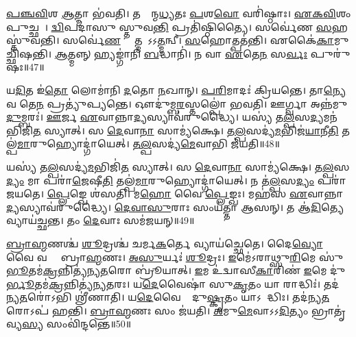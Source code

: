 \ul{𑌪}\ul{𑌞𑍍𑌚}\ul{𑌵𑌿}\ul{}𑌶 \ul{𑌆}𑌤𑍍𑌮𑌾 𑌭॑𑌵𑌤𑌿।
𑌤𑌸𑍍𑌮𑌾᳚𑌨𑍍𑌮\ul{𑌧𑍍𑌯}𑌤𑌃 \ul{𑌪}𑌶\ul{𑌵𑍋} 𑌵𑌰𑌿॑𑌷𑍍𑌠𑌾𑌃।
\ul{𑌏}\ul{𑌕}\ul{𑌵𑌿}\ul{}𑌶𑌂 𑌪𑍁𑌚𑍍𑌛𑌮𑍍᳚।
\ul{𑌦𑍍𑌵𑌿}𑌪𑌦𑌾॑𑌸𑍁 𑌸𑍍𑌤𑍁𑌵\ul{𑌨𑍍𑌤𑌿} 𑌪𑍍𑌰𑌤𑌿॑\-𑌷𑍍𑌠𑌿𑌤𑍍𑌯𑍈।
𑌸𑌰𑍍𑌵𑍇॑𑌣 \ul{𑌸}𑌹 𑌸𑍍𑌤𑍁॑𑌵𑌨𑍍𑌤𑌿।
𑌸𑌰𑍍𑌵𑍇॑\ul{𑌣} 𑌹𑍍𑌯𑌾᳚𑌤𑍍𑌮𑌨𑌾᳚\-𑌽𑌽\ul{𑌤𑍍𑌮}𑌨𑍍𑌵𑍀।
\ul{𑌸}𑌹𑍋𑌤𑍍𑌪𑌤॑𑌨𑍍𑌤𑌿।
𑌏𑌕𑍈॑\ul{𑌕𑌾}𑌮𑍁𑌚𑍍𑌛𑌿॑𑌷𑌨𑍍𑌤𑌿।
\ul{𑌆}𑌤𑍍𑌮𑌨𑍍𑌨𑍍 𑌹𑍍𑌯𑌙𑍍𑌗𑌾॑𑌨𑌿 \ul{𑌬}𑌦𑍍𑌧𑌾𑌨𑌿॑।
𑌨 𑌵𑌾 \ul{𑌏}𑌤𑍇\ul{𑌨} 𑌸\ul{𑌰𑍍𑌵𑌃} 𑌪𑍁𑌰𑍁॑𑌷𑌃॥47॥

𑌯\ul{𑌦𑌿}𑌤 𑌇॑\ul{𑌤𑍋} 𑌲𑍋𑌮𑌾॑𑌨𑌿 \ul{𑌦}𑌤𑍋 \ul{𑌨}𑌖𑌾𑌨𑍍।
\ul{𑌪}\ul{𑌰𑌿}𑌮𑌾𑌦𑌃॑ 𑌕𑍍𑌰𑌿𑌯𑌨𑍍𑌤𑍇।
𑌤𑌾\ul{𑌨𑍍𑌯𑍇}𑌵 𑌤𑍇\ul{𑌨} 𑌪𑍍𑌰𑌤𑍍𑌯𑍁॑𑌪𑍍𑌯𑌨𑍍𑌤𑍇।
𑌔𑌦𑍁॑𑌮𑍍𑌬\ul{𑌰}𑌸𑍍𑌤𑌲𑍍𑌪𑍋॑ 𑌭𑌵𑌤𑌿।
𑌊𑌰𑍍𑌗𑍍𑌵𑌾 𑌅𑌨𑍍𑌨॑𑌮𑍁\ul{𑌦𑍁}𑌮𑍍𑌬𑌰𑌃॑।
\ul{𑌊}𑌰𑍍𑌜 \ul{𑌏}𑌵𑌾𑌨𑍍𑌨𑌾\ul{𑌦𑍍𑌯}𑌸𑍍𑌯𑌾𑌵॑𑌰𑍁𑌦𑍍𑌧𑍍𑌯𑍈।
𑌯𑌸𑍍𑌯॑ 𑌤\ul{𑌲𑍍𑌪}𑌸\ul{𑌦𑍍𑌯}𑌮𑌨॑𑌭𑌿𑌜𑌿\ul{𑌤}\ul{} 𑌸𑍍𑌯𑌾𑌤𑍍।
𑌸 \ul{𑌦𑍇}𑌵𑌾\ul{𑌨𑌾}\ul{} 𑌸𑌾𑌮𑍍𑌯॑𑌕𑍍𑌷𑍇।
\ul{𑌤}\ul{𑌲𑍍𑌪}𑌸𑌦𑍍𑌯॑\ul{𑌮}𑌭𑌿𑌜॑\ul{𑌯𑌾}𑌨𑍀\ul{𑌤𑌿} 𑌤𑌲𑍍𑌪॑\ul{𑌮𑌾}𑌰𑍁𑌹𑍍𑌯𑍋𑌦𑍍𑌗𑌾॑𑌯𑍇𑌤𑍍।
\ul{𑌤}\ul{𑌲𑍍𑌪}𑌸𑌦𑍍𑌯॑\ul{𑌮𑍇}𑌵𑌾𑌭𑌿 𑌜॑𑌯𑌤𑌿॥48॥

𑌯𑌸𑍍𑌯॑ 𑌤\ul{𑌲𑍍𑌪}𑌸𑌦𑍍𑌯॑\ul{𑌮}𑌭𑌿𑌜𑌿॑\ul{𑌤}\ul{} 𑌸𑍍𑌯𑌾𑌤𑍍।
𑌸 \ul{𑌦𑍇}𑌵𑌾\ul{𑌨𑌾}\ul{} 𑌸𑌾𑌮𑍍𑌯॑𑌕𑍍𑌷𑍇।
\ul{𑌤}\ul{𑌲𑍍𑌪}𑌸\ul{𑌦𑍍𑌯𑌂} 𑌮𑌾 𑌪𑌰𑌾॑\ul{𑌜𑍇}𑌷𑍀\ul{𑌤𑌿} 𑌤𑌲𑍍𑌪॑\ul{𑌮𑌾}𑌰𑍁𑌹𑍍𑌯𑍋𑌦𑍍𑌗𑌾॑𑌯𑍇𑌤𑍍।
𑌨 𑌤॑\ul{𑌲𑍍𑌪}𑌸\ul{𑌦𑍍𑌯𑌂} 𑌪𑌰𑌾॑𑌜𑌯𑌤𑍇।
\ul{𑌪𑍍𑌲𑍇}𑌙𑍍𑌖𑍇 𑌶॑𑌸𑌤𑌿।
𑌮\ul{𑌹𑍋} 𑌵𑍈 \ul{𑌪𑍍𑌲𑍇}𑌙𑍍𑌖𑌃।
𑌮𑌹॑𑌸 \ul{𑌏}𑌵𑌾𑌨𑍍𑌨𑌾\ul{𑌦𑍍𑌯}𑌸𑍍𑌯𑌾𑌵॑𑌰𑍁𑌦𑍍𑌧𑍍𑌯𑍈।
\ul{𑌦𑍇}\ul{𑌵𑌾}\ul{𑌸𑍁}𑌰𑌾𑌃 𑌸𑌂𑌯॑𑌤𑍍𑌤𑌾 𑌆𑌸𑌨𑍍।
𑌤 𑌆॑\ul{𑌦𑌿}𑌤𑍍𑌯𑍇 𑌵𑍍𑌯𑌾𑌯॑𑌚𑍍𑌛𑌨𑍍𑌤।
𑌤𑌂 \ul{𑌦𑍇}𑌵𑌾𑌃 𑌸𑌮॑𑌜𑌯𑌨𑍍॥49॥

\ul{𑌬𑍍𑌰𑌾}\ul{𑌹𑍍𑌮}𑌣𑌶𑍍𑌚॑ \ul{𑌶𑍂}𑌦𑍍𑌰𑌶𑍍𑌚॑ 𑌚𑌰𑍍𑌮\ul{𑌕}𑌰𑍍𑌤𑍇 𑌵𑍍𑌯𑌾𑌯॑𑌚𑍍𑌛𑍇𑌤𑍇।
𑌦𑍈\ul{𑌵𑍍𑌯𑍋} 𑌵𑍈 𑌵𑌰𑍍𑌣𑍋᳚ 𑌬𑍍𑌰𑌾\ul{𑌹𑍍𑌮}𑌣𑌃।
\ul{𑌅}\ul{𑌸𑍁}𑌰𑍍𑌯𑌃॑ \ul{𑌶𑍂}𑌦𑍍𑌰𑌃।
\ul{𑌇}𑌮𑍇॑\-𑌽𑌰𑌾𑌥𑍍𑌸𑍁\ul{𑌰𑌿}𑌮𑍇 𑌸𑍁॑\ul{𑌭𑍂}𑌤𑌮॑\ul{𑌕𑍍𑌰}𑌨𑍍𑌨𑌿𑌤𑍍𑌯॑𑌨𑍍𑌯\ul{𑌤}𑌰𑍋 𑌬𑍍𑌰𑍂॑𑌯𑌾𑌤𑍍।
\ul{𑌇}𑌮 𑌉॑𑌦𑍍𑌵𑌾𑌸𑍀\ul{𑌕𑌾}𑌰𑌿𑌣॑ \ul{𑌇}𑌮𑍇 𑌦𑍁॑\ul{𑌰𑍍𑌭𑍂}𑌤𑌮॑\ul{𑌕𑍍𑌰}𑌨𑍍𑌨𑌿𑌤𑍍𑌯॑𑌨𑍍𑌯\ul{𑌤}𑌰𑌃।
𑌯\ul{𑌦𑍇}𑌵𑍈𑌷𑌾॑ 𑌸𑍁\ul{𑌕𑍃}𑌤𑌂 𑌯𑌾 𑌰𑌾𑌦𑍍𑌧𑌿𑌃॑।
𑌤𑌦॑𑌨𑍍𑌯\ul{𑌤}𑌰𑍋॑𑌽𑌭𑌿 𑌶𑍍𑌰𑍀॑𑌣𑌾𑌤𑌿।
𑌯\ul{𑌦𑍇}𑌵𑍈𑌷𑌾𑌂᳚ 𑌦𑍁\ul{𑌷𑍍𑌕𑍃}𑌤𑌂 𑌯𑌾𑌽𑌰𑌾᳚𑌦𑍍𑌧𑌿𑌃।
𑌤𑌦॑𑌨𑍍𑌯\ul{𑌤}𑌰𑍋𑌽𑌪॑ 𑌹𑌨𑍍𑌤𑌿।
\ul{𑌬𑍍𑌰𑌾}\ul{𑌹𑍍𑌮}𑌣𑌃 𑌸𑌂 𑌜॑𑌯𑌤𑌿।
\ul{𑌅}𑌮𑍁\ul{𑌮𑍇}𑌵𑌾𑌽𑌽\ul{𑌦𑌿}𑌤𑍍𑌯𑌂 𑌭𑍍𑌰𑌾𑌤𑍃॑𑌵𑍍𑌯\ul{𑌸𑍍𑌯} 𑌸𑌂𑌵𑌿॑𑌨𑍍𑌦𑌨𑍍𑌤𑍇॥50॥




\clearpage
{}
\setcounter{anuvakam}{0}

